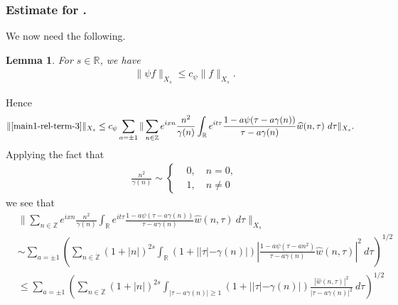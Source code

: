 \documentclass[12pt,reqno]{amsart}
\numberwithin{equation}{section}  %
\renewcommand{\cref}{\Cref}
\newcommand{\rr}{\mathbb{R}}
\newcommand{\zz}{\mathbb{Z}}
\newcommand{\zzdot}{\dot{\zz}}
\newcommand{\wh}{\widehat}
\newtheorem{lemma}[theorem]{Lemma}
\begin{document}
\subsubsection{Estimate for \cref{main1-rel-term-3}.}
%
%
%
%
%
%
%
%
%
We now need the following.
%
\begin{lemma}
\label{lem:schwartz-mult}
For $s\in \rr$, we have
%
%
\begin{equation}
	\label{schwartz-mult}
	\begin{split}
    \|\psi f \|_{X_{s}} \le c_{\psi}  \|f \|_{X_{s}}.
	\end{split}
\end{equation}
%
%
\end{lemma}
%
Hence
%
%
\begin{equation}
  \label{yu}
	\begin{split}
		\|\cref{main1-rel-term-3}\|_{X_{s}} 
    & \le c_{\psi} 
    \sum_{a = \pm 1} \| \sum_{n \in \zz}  e^{ixn} \frac{n^{2}}{\gamma(n)}\int_\rr 
		e^{it \tau} \frac{1 - a\psi (\tau - a\gamma(n) ) 
}{\tau - a\gamma(n)} \wh{w}(n, \tau) \ 
		d \tau\|_{X_{s}}.
			\end{split}
\end{equation}
%
Applying the fact that 
%
%
\begin{equation*}
\begin{split}
\frac{n^{2}}{\gamma(n)} \sim 
\begin{cases}
  & 0, \quad n=0, \\
  & 1, \quad n \neq 0
\end{cases}
\end{split}
\end{equation*}
%
%
we see that
%
%
\begin{equation}
\label{main-int2-est-X-s-part}
\begin{split}
  & \| \sum_{n \in \zz} e^{ixn} \frac{n^{2}}{\gamma(n)}\int_\rr 
		e^{it \tau} \frac{1 - a\psi (\tau - a\gamma(n) ) 
  }{\tau - a\gamma(n)} \wh{w}(n, \tau) \ 
		d \tau\|_{X_{s}}
		\\
    & \sim \sum_{a = \pm 1}\left( \sum_{n \in \zzdot} \left (1 + |n| \right )^{2s} \int_\rr
    (1 + |  |\tau| - \gamma(n)|) \left | \frac{1 - a\psi(\tau - an^{2 
})}{\tau - a\gamma(n)} 
     \wh{w}(n, \tau) \right |^2 \ d 
		\tau \right)^{1/2}
		\\
    & \le \sum_{a = \pm 1}
    \left( \sum_{n \in \zzdot} \left (1 + |n| \right )^{2s} \int_{| \tau - a\gamma(n)| \ge 1}
    (1 + | |\tau| - \gamma(n)|) \frac{|  \wh{w}(n, \tau)|^2}{|\tau - a\gamma(n)|^2} 
		\ d 
		\tau \right)^{1/2}
  \end{split}
\end{equation}
\end{document}
